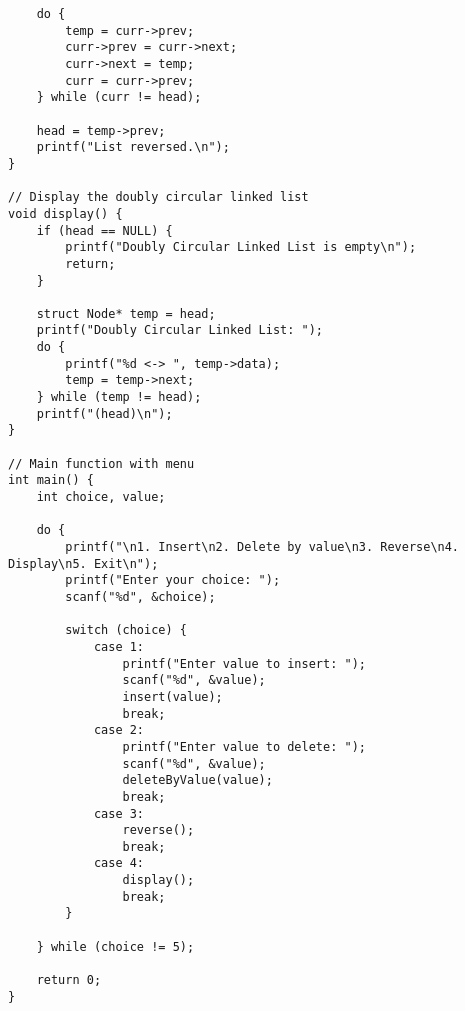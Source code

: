 \documentclass[12pt,a4paper]{article}
\begin{document}
\begin{lstlisting}
    do {
        temp = curr->prev;
        curr->prev = curr->next;
        curr->next = temp;
        curr = curr->prev;
    } while (curr != head);

    head = temp->prev;
    printf("List reversed.\n");
}

// Display the doubly circular linked list
void display() {
    if (head == NULL) {
        printf("Doubly Circular Linked List is empty\n");
        return;
    }

    struct Node* temp = head;
    printf("Doubly Circular Linked List: ");
    do {
        printf("%d <-> ", temp->data);
        temp = temp->next;
    } while (temp != head);
    printf("(head)\n");
}

// Main function with menu
int main() {
    int choice, value;

    do {
        printf("\n1. Insert\n2. Delete by value\n3. Reverse\n4. Display\n5. Exit\n");
        printf("Enter your choice: ");
        scanf("%d", &choice);

        switch (choice) {
            case 1:
                printf("Enter value to insert: ");
                scanf("%d", &value);
                insert(value);
                break;
            case 2:
                printf("Enter value to delete: ");
                scanf("%d", &value);
                deleteByValue(value);
                break;
            case 3:
                reverse();
                break;
            case 4:
                display();
                break;
        }

    } while (choice != 5);

    return 0;
}
\end{lstlisting}
\end{document}
